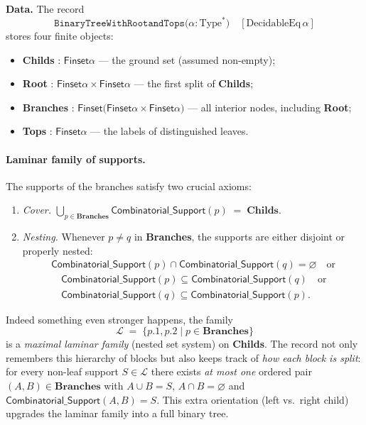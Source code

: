 \documentclass[11pt]{amsart}
\theoremstyle{remark}            %
\newcommand{\supp}{\mathsf{Combinatorial\_Support}}
\newcommand{\Fin}{\mathsf{Finset}}
\begin{document}
\textbf{Data.}  The record 
\[
\texttt{BinaryTreeWithRootandTops}
\bigl(\alpha : \mathrm{Type}^\ast\bigr)
\quad [\mathrm{DecidableEq}\,\alpha]
\]
stores four finite objects:

\begin{itemize}[leftmargin=1.8em]
  \item \textbf{Childs} : $\Fin \alpha$ — the ground set (assumed non-empty);
  \item \textbf{Root}   : $\Fin\alpha \times \Fin\alpha$ — the first split of \textbf{Childs};
  \item \textbf{Branches} : $\Fin\bigl(\Fin\alpha \times \Fin\alpha\bigr)$ —
        all interior nodes, including \textbf{Root};
  \item \textbf{Tops}   : $\Fin \alpha$ — the labels of distinguished leaves.
\end{itemize}
 
\paragraph{Laminar family of supports.}
The supports of the branches satisfy two crucial axioms:

\begin{enumerate}[label=\textbf{(L\arabic*)},leftmargin=1.8em]
  \item \emph{Cover.}  $\displaystyle
        \bigcup_{p\in\textbf{Branches}} \supp(p) \;=\; \textbf{Childs}.$
  \item \emph{Nesting.}  Whenever $p\neq q$ in \textbf{Branches},
        the supports are either disjoint or properly nested:
       \begin{align*} 
        \supp(p)\cap\supp(q)=\varnothing
        \quad\text{or}\\ \quad
        \supp(p)\subseteq\supp(q)
        \quad\text{or}\\\quad
        \supp(q)\subseteq\supp(p).
        \end{align*} 
\end{enumerate}

Indeed something even stronger happens, the family 
$$
\mathcal{L}\;=\;\{p.1, p.2 \mid p\in\textbf{Branches}\}
$$
is a \emph{maximal laminar family} (nested set system) on \textbf{Childs}.  
The record not only remembers this hierarchy of blocks but also keeps track of
\emph{how each block is split}: for every non-leaf support
$S\in\mathcal{L}$ there exists \emph{at most  one} ordered pair
$(A,B)\in\textbf{Branches}$ with $A\cup B=S$, $A\cap B=\varnothing$ and
$\supp(A,B)=S$.  This extra orientation (left vs.\ right child) upgrades the
laminar family into a full binary tree.
\end{document}
